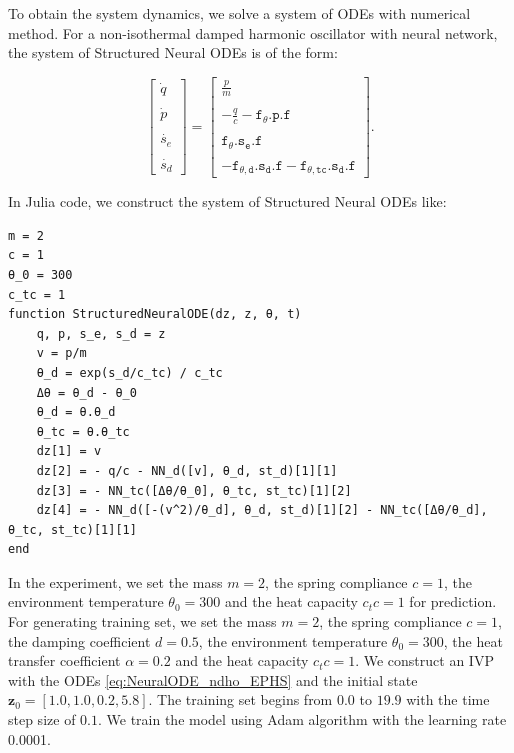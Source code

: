 \documentclass[
	parskip, 			   %
	twoside, 			   %
	DIV=14, 			   %
	BCOR=15.0mm, 		   %
	headsepline, 		   %
	open=right, 		   %
	captions=tableheading, %
	bibliography=totoc,    %
	numbers=noenddot       %
]{scrreprt}
\begin{document}
To obtain the system dynamics, we solve a system of ODEs with numerical method. For a non-isothermal damped harmonic oscillator with neural network, the system of Structured Neural ODEs is of the form:

\begin{equation}
    \label{eq:NeuralODE_ndho_EPHS}
    \begin{bmatrix}
    \dot{q}\\\\
    \dot{p}\\\\
    \dot{s_e}\\\\
    \dot{s_d}
    \end{bmatrix}
    =
    \begin{bmatrix}
    \frac{p}{m}\\\\
    -\frac{q}{c}-\mathtt{f_{\theta}.p.f}\\\\
    \mathtt{f_{\theta}.s_{e}.f}\\\\
    -\mathtt{f_{\theta, d}.s_{d}.f}-\mathtt{f_{\theta, tc}.s_{d}.f}
    \end{bmatrix}.
\end{equation}

In Julia code, we construct the system of Structured Neural ODEs like:

\begin{verbatim}
m = 2
c = 1
θ_0 = 300
c_tc = 1
function StructuredNeuralODE(dz, z, θ, t)
    q, p, s_e, s_d = z
    v = p/m
    θ_d = exp(s_d/c_tc) / c_tc
    Δθ = θ_d - θ_0
    θ_d = θ.θ_d
    θ_tc = θ.θ_tc   
    dz[1] = v
    dz[2] = - q/c - NN_d([v], θ_d, st_d)[1][1]
    dz[3] = - NN_tc([Δθ/θ_0], θ_tc, st_tc)[1][2]
    dz[4] = - NN_d([-(v^2)/θ_d], θ_d, st_d)[1][2] - NN_tc([Δθ/θ_d], θ_tc, st_tc)[1][1]
end
\end{verbatim}

In the experiment, we set the mass $m=2$, the spring compliance $c=1$, the environment temperature $\theta_{0}=300$ and the heat capacity $c_tc=1$ for prediction. For generating training set, we set the mass $m=2$, the spring compliance $c=1$, the damping coefficient $d=0.5$, the environment temperature $\theta_{0}=300$, the heat transfer coefficient $\alpha=0.2$ and the heat capacity $c_tc=1$. We construct an IVP with the ODEs \ref{eq:NeuralODE_ndho_EPHS} and the initial state $\mathbf{z}_{0} = [1.0, 1.0, 0.2, 5.8]$. The training set begins from $0.0$ to $19.9$ with the time step size of $0.1$. We train the model using Adam algorithm with the learning rate 0.0001.
\end{document}
